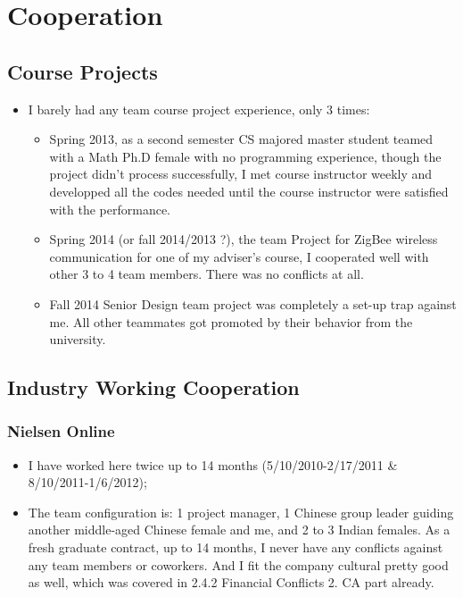 \documentclass[9pt,b5paper]{article}
\begin{document}
\section{Cooperation}
\label{sec-4}
\subsection{Course Projects}
\label{sec-4-1}
\begin{itemize}
\item I barely had any team course project experience, only 3 times:
\begin{itemize}
\item Spring 2013, as a second semester CS majored master student teamed with a Math Ph.D female with no programming experience, though the project didn't process successfully, I met course instructor weekly and developped all the codes needed until the course instructor were satisfied with the performance.
\item Spring 2014 (or fall 2014/2013 ?), the team Project for ZigBee wireless communication for one of my adviser's course, I cooperated well with other 3 to 4 team members. There was no conflicts at all.
\item Fall 2014 Senior Design team project was completely a set-up trap against me. All other teammates got promoted by their behavior from the university.
\end{itemize}
\end{itemize}
\subsection{Industry Working Cooperation}
\label{sec-4-2}
\subsubsection{Nielsen Online}
\label{sec-4-2-1}
\begin{itemize}
\item I have worked here twice up to 14 months (5/10/2010-2/17/2011 \& 8/10/2011-1/6/2012);
\item The team configuration is: 1 project manager, 1 Chinese group leader guiding another middle-aged Chinese female and me, and 2 to 3 Indian females. As a fresh graduate contract, up to 14 months, I never have any conflicts against any team members or coworkers. And I fit the company cultural pretty good as well, which was covered in 2.4.2 Financial Conflicts 2. CA part already.
\end{itemize}
\end{document}
